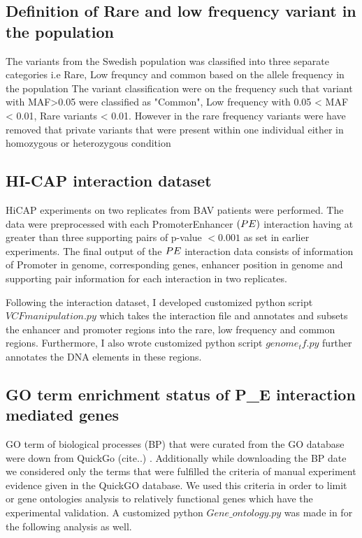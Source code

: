 \documentclass[11pt]{article} %
\begin{document}
\subsection{Definition of Rare and low frequency variant in the population}


The variants from the Swedish population was classified into three separate categories i.e Rare, Low frequncy and common based on the allele frequency  in the population The variant classification were on the frequency such that variant with MAF\textgreater{}0.05 were classified as "Common", Low frequency with 0.05 \textless{} MAF \textless{} 0.01, Rare variants \textless{} 0.01. However in the rare frequency variants were have removed that private variants that were present within one individual either in homozygous or heterozygous condition


\subsection{HI-CAP interaction dataset}

HiCAP experiments on two replicates from BAV patients were performed. The data were preprocessed with each Promoter\-Enhancer  $(P\-E)$ interaction having at greater than three supporting pairs of p-value $< 0.001$ as set in earlier experiments. The final output of the $P\-E$ interaction data consists of information of Promoter in genome, corresponding genes, enhancer position in genome and supporting pair information for each interaction in  two replicates. 

Following the interaction dataset, I developed customized python script $VCFmanipulation.py$  which takes the interaction file and annotates and subsets the enhancer and promoter regions into the rare, low frequency and common regions. Furthermore, I also wrote customized python script $genome_tf.py$ further annotates the DNA elements in these regions.


\subsection {GO term enrichment status of P\_E interaction mediated genes}

GO term of biological processes (BP) that were curated from the GO database were down from QuickGo (cite..) . Additionally while downloading  the  BP date we considered only the terms that were fulfilled the criteria of manual experiment evidence given in the
QuickGO database. We used this criteria in order to limit or gene ontologies analysis to relatively functional genes which have the experimental validation. A customized python $Gene\_ontology.py$ was made in for the following analysis as well.
\end{document}
